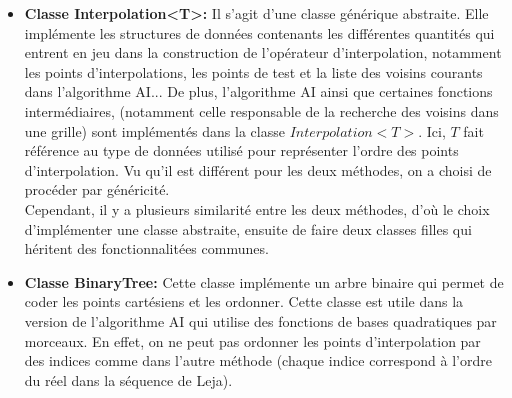 \begin{itemize}
\item \textbf{Classe Interpolation<T>:} Il s'agit d'une classe générique abstraite. Elle implémente les structures de données contenants les différentes quantités qui entrent
en jeu dans la construction de l'opérateur d'interpolation, notamment les points d'interpolations, les points de test et
la liste des voisins courants dans l'algorithme AI... De plus, l'algorithme AI ainsi que certaines fonctions intermédiaires,
(notamment celle responsable de la recherche des voisins dans une grille) sont implémentés dans la classe $Interpolation<T>$.
Ici, $T$ fait référence au type de données utilisé pour représenter l'ordre des points d'interpolation. Vu qu'il est différent pour les deux méthodes, on a choisi de procéder par généricité.\\
Cependant, il y a plusieurs similarité entre les deux méthodes, d'où le choix d'implémenter une classe abstraite, ensuite de faire deux classes filles qui héritent des fonctionnalitées communes.

\item \textbf{Classe BinaryTree:} Cette classe implémente un arbre binaire qui permet de coder les points cartésiens et les ordonner.
Cette classe est utile dans la version de l'algorithme AI qui utilise des fonctions de bases quadratiques par morceaux.
En effet, on ne peut pas ordonner les points d'interpolation par des indices comme dans l'autre méthode (chaque indice correspond à l'ordre du réel dans la séquence de Leja).\\


\end{itemize}
